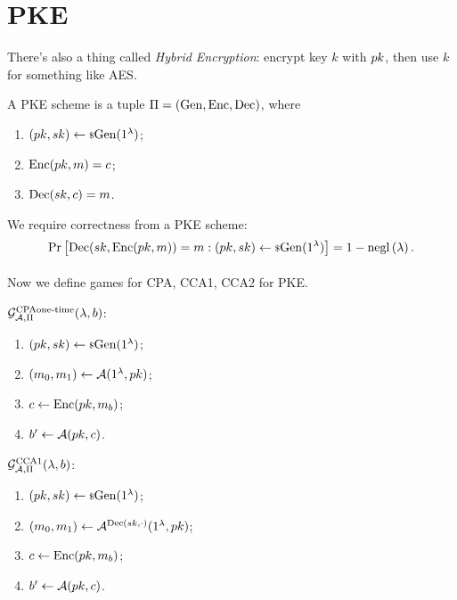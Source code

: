 
\chapter{\acl{PKE}}


There's also a thing called \emph{Hybrid Encryption}: encrypt key $k$ with $pk$, then use $k$ for something like \ac{AES}.

\begin{definition}
	A \ac{PKE} scheme is a tuple $\Pi = \left( \mathrm{Gen} , \allowbreak \mathrm{Enc} , \allowbreak \mathrm{Dec} \right)$, where
	\begin{enumerate}
		\item $(pk, sk) \leftarrow {\scriptstyle \$} {\mathrm{Gen}(1^{\lambda})}$;
		\item $\mathrm{Enc}(pk, m) = c$;
		\item $\mathrm{Dec}(sk, c) = m$. \qedhere
	\end{enumerate}
\end{definition}
We require correctness from a \ac{PKE} scheme:
\begin{equation*}
	\mathop{\mathrm{Pr}}\limits_{} \left[ {
		\mathrm{Dec}(sk, \mathrm{Enc}(pk, m)) = m : (pk, sk) \leftarrow {\scriptstyle \$} {\mathrm{Gen}(1^{\lambda})}
	} \right]
	= 1 - \mathrm{negl}\left({\lambda}\right).
\end{equation*}

Now we define games for \ac{CPA}, \ac{CCA}1, \ac{CCA}2 for \ac{PKE}.

\begin{definition}
	$\mathcal{G}_{\mathcal{A}, \Pi}^{\text{CPA \\ one-time}}(\lambda, b)$:
	\begin{enumerate}
		\item $(pk, sk) \leftarrow {\scriptstyle \$} {\mathrm{Gen}(1^{\lambda})}$;
		\item $(m_0, m_1) \leftarrow \mathcal{A}(1^{\lambda}, pk)$;
		\item $c \leftarrow \mathrm{Enc}(pk, m_b)$;
		\item $b' \leftarrow \mathcal{A}(pk, c)$. \qedhere
	\end{enumerate}
\end{definition}

\begin{definition}
	$\mathcal{G}_{\mathcal{A}, \Pi}^{\text{CCA{1}}}(\lambda, b)$:
	\begin{enumerate}
		\item $(pk, sk) \leftarrow {\scriptstyle \$} {\mathrm{Gen}(1^{\lambda})}$;
		\item $(m_0, m_1) \leftarrow \mathcal{A}^{\mathrm{Dec}(sk, \cdot)}(1^{\lambda}, pk)$;
		\item $c \leftarrow \mathrm{Enc}(pk, m_b)$;
		\item $b' \leftarrow \mathcal{A}(pk, c)$. \qedhere
	\end{enumerate}
\end{definition}

